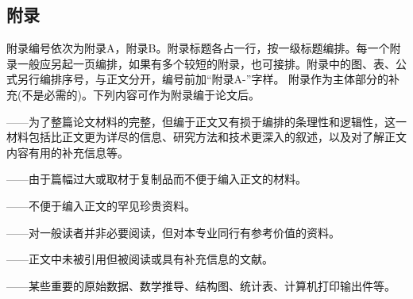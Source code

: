 \subsection{附录}
附录编号依次为附录A，附录B。附录标题各占一行，按一级标题编排。每一个附录一般应另起一页编排，如果有多个较短的附录，也可接排。附录中的图、表、公式另行编排序号，与正文分开，编号前加“附录A-”字样。
附录作为主体部分的补充(不是必需的)。下列内容可作为附录编于论文后。

——为了整篇论文材料的完整，但编于正文又有损于编排的条理性和逻辑性，这一材料包括比正文更为详尽的信息、研究方法和技术更深入的叙述，以及对了解正文内容有用的补充信息等。

——由于篇幅过大或取材于复制品而不便于编入正文的材料。

——不便于编入正文的罕见珍贵资料。

——对一般读者并非必要阅读，但对本专业同行有参考价值的资料。

——正文中未被引用但被阅读或具有补充信息的文献。

——某些重要的原始数据、数学推导、结构图、统计表、计算机打印输出件等。
